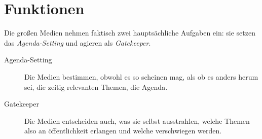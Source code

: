 \documentclass{article}
\begin{document}
\section{Funktionen}
Die großen Medien nehmen faktisch zwei hauptsächliche Aufgaben ein: sie setzen das \emph{Agenda-Setting} und agieren als \emph{Gatekeeper}.
\begin{description}
 \item[Agenda-Setting] Die Medien bestimmen, obwohl es so scheinen mag, als ob es anders herum sei, die zeitig relevanten Themen, die Agenda.
 \item[Gatekeeper] Die Medien entscheiden auch, was sie selbst ausstrahlen, welche Themen also an öffentlichkeit erlangen und welche verschwiegen werden.
\end{description} 
\end{document}
